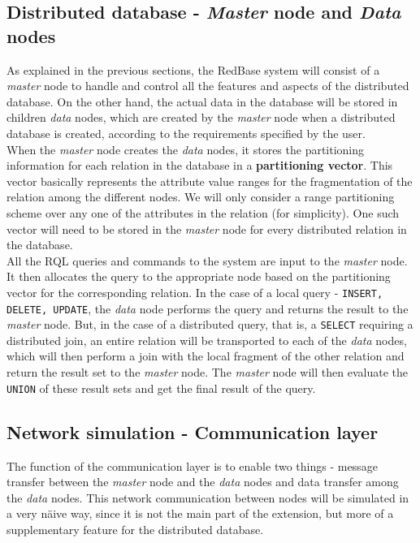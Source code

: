 \documentclass[letterpaper,11pt]{article}
\begin{document}
\subsection{Distributed database - \textit{Master} node and \textit{Data} nodes}
As explained in the previous sections, the RedBase system will consist of a \textit{master} node
to handle and control all the features and aspects of the distributed database. On the other hand,
the actual data in the database will be stored in children \textit{data} nodes, which are created
by the \textit{master} node when a distributed database is created, according to the requirements
specified by the user.\\

When the \textit{master} node creates the \textit{data} nodes, it stores the partitioning information
for each relation in the database in a \textbf{partitioning vector}. This vector basically represents
the attribute value ranges for the fragmentation of the relation among the different nodes. We will
only consider a range partitioning scheme over any one of the attributes in the relation (for
simplicity). One such vector will need to be stored in the \textit{master} node for every distributed
relation in the database.\\

All the RQL queries and commands to the system are input to the \textit{master} node. It then allocates
the query to the appropriate node based on the partitioning vector for the corresponding relation. In
the case of a local query - \texttt{INSERT, DELETE, UPDATE}, the \textit{data} node performs the query
and returns the result to the \textit{master} node. But, in the case of a distributed query, that is,
a \texttt{SELECT} requiring a distributed join, an entire relation will be transported to each of the
\textit{data} nodes, which will then perform a join with the local fragment of the other relation and
return the result set to the \textit{master} node. The \textit{master} node will then evaluate the
\texttt{UNION} of these result sets and get the final result of the query.

\subsection{Network simulation - Communication layer}
The function of the communication layer is to enable two things - message transfer between the
\textit{master} node and the \textit{data} nodes and data transfer among the \textit{data} nodes.
This network communication between nodes will be simulated in a very n\"aive way, since it is not
the main part of the extension, but more of a supplementary feature for the distributed database.\\
\end{document}
